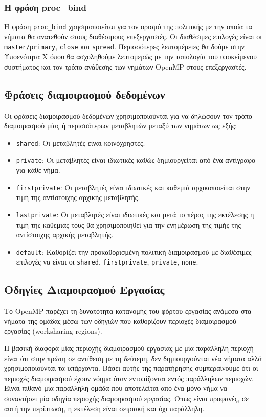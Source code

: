 \subsubsection{Η φράση proc\_bind}
Η φράση \texttt{proc\_bind} χρησιμοποιείται για τον ορισμό της πολιτικής με την οποία τα νήματα θα ανατεθούν στους διαθέσιμους επεξεργαστές. Οι διαθέσιμες επιλογές είναι οι \texttt{master/primary}, \texttt{close} και \texttt{spread}. Περισσότερες λεπτομέρειες θα δούμε στην Υποενότητα Χ όπου θα ασχοληθούμε λεπτομερώς με την τοπολογία του υποκείμενου συστήματος και τον τρόπο ανάθεσης των νημάτων OpenMP στους επεξεργαστές.


\subsection{Φράσεις διαμοιρασμού δεδομένων}
Οι φράσεις διαμοιρασμού δεδομένων χρησιμοποιούνται για να δηλώσουν τον τρόπο διαμοιρασμού μίας ή περισσότερων μεταβλητών μεταξύ των νημάτων ως εξής:
\begin{itemize}
	\item \texttt{shared}: Οι μεταβλητές είναι κοινόχρηστες.
	\item \texttt{private}: Οι μεταβλητές είναι ιδιωτικές καθώς δημιουργείται από ένα αντίγραφο για κάθε νήμα.
	\item \texttt{firstprivate}: Οι μεταβλητές είναι ιδιωτικές και καθεμιά αρχικοποιείται στην τιμή της αντίστοιχης αρχικής μεταβλητής.
	\item \texttt{lastprivate}: Οι μεταβλητές είναι ιδιωτικές και μετά το πέρας της εκτέλεσης η τιμή της καθεμιάς τους θα χρησιμοποιηθεί για την ενημέρωση της τιμής της αντίστοιχης αρχικής μεταβλητής.
	\item \texttt{default}: Καθορίζει την προκαθορισμένη πολιτική διαμοιρασμού με διαθέσιμες επιλογές να είναι οι \texttt{shared}, \texttt{firstprivate}, \texttt{private}, \texttt{none}.
\end{itemize}


\subsection{Οδηγίες Διαμοιρασμού Εργασίας}
Το OpenMP παρέχει τη δυνατότητα κατανομής του φόρτου εργασίας ανάμεσα στα νήματα της ομάδας μέσω των οδηγιών που καθορίζουν περιοχές διαμοιρασμού εργασίας (worksharing regions).

Η βασική διαφορά μίας περιοχής διαμοιρασμού εργασίας με μία παράλληλη περιοχή είναι ότι στην πρώτη σε αντίθεση με τη δεύτερη, δεν δημιουργούνται νέα νήματα αλλά χρησιμοποιούνται τα υπάρχοντα. Βάσει αυτής της παρατήρησης συμπεραίνουμε ότι οι περιοχές διαμοιρασμού έχουν νόημα όταν εντοπίζονται εντός παράλληλων περιοχών. Είναι πιθανό μία παράλληλη ομάδα που αποτελείται από ένα μόνο νήμα να συναντήσει μία οδηγία περιοχής διαμοιρασμού εργασίας. Όπως είναι προφανές, σε αυτή την περίπτωση, η εκτέλεση είναι σειριακή και όχι παράλληλη.

